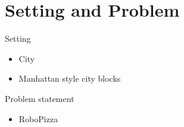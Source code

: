 \section{Setting and Problem}

\begin{frame}{Setting}
    \begin{itemize}
        \item City
        \item Manhattan style city blocks
    \end{itemize}
\end{frame}

\begin{frame}{Problem statement}
    \begin{itemize}
        \item RoboPizza
    \end{itemize}
\end{frame}
